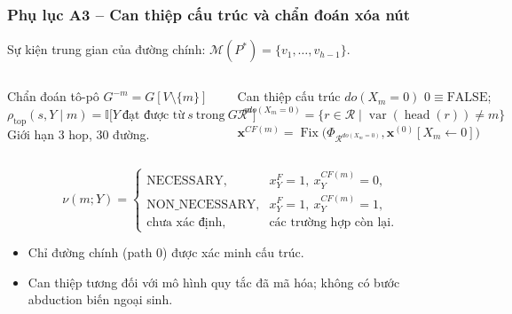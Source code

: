 \begin{frame}
\frametitle{Phụ lục A3 -- Can thiệp cấu trúc và chẩn đoán xóa nút}
\footnotesize
Sự kiện trung gian của đường chính: $\mathcal M(P^{*})=\{v_1,\dots,v_{h-1}\}$.

\vspace{0.1cm}
\begin{columns}[T,onlytextwidth]
\begin{block}{Chẩn đoán tô-pô}
\footnotesize
$G^{-m}=G[V\setminus\{m\}]$\\[2pt]
$\rho_{\text{top}}(s,Y\mid m)=\mathbb I\big[Y\ \text{đạt được từ}\ s\ \text{trong}\ G^{-m}\big]$\\[2pt]
Giới hạn 3 hop, 30 đường.
\end{block}
\begin{block}{Can thiệp cấu trúc $do(X_m=0)$}
\footnotesize
$0\equiv\text{FALSE}$;\quad $\mathcal R^{do(X_m=0)}=\{r\in\mathcal R\mid \operatorname{var}(\operatorname{head}(r))\neq m\}$\\[2pt]
$\mathbf x^{CF(m)}=\operatorname{Fix}\big(\Phi_{\mathcal R^{do(X_m=0)}},\mathbf x^{(0)}[X_m\leftarrow0]\big)$
\end{block}
\end{columns}

\vspace{0.12cm}
\[
\nu(m;Y)=\begin{cases}
\text{NECESSARY}, & x_Y^{F}=1,\ x_Y^{CF(m)}=0,\\
\text{NON\_NECESSARY}, & x_Y^{F}=1,\ x_Y^{CF(m)}=1,\\
\text{chưa xác định}, & \text{các trường hợp còn lại.}
\end{cases}
\]

\begin{itemize}
  \item Chỉ đường chính (path 0) được xác minh cấu trúc.
  \item Can thiệp tương đối với mô hình quy tắc đã mã hóa; không có bước abduction biến ngoại sinh.
\end{itemize}
\end{frame}

